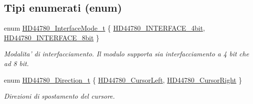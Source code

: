 \subsection*{Tipi enumerati (enum)}
\begin{DoxyCompactItemize}
\item 
enum \hyperlink{group___h_d44780_gaaaea8b73e24f7658da4118f6b01b45f0}{H\+D44780\+\_\+\+Interface\+Mode\+\_\+t} \{ \hyperlink{group___h_d44780_ggaaaea8b73e24f7658da4118f6b01b45f0a45bf6ce7ec7c951f692bdce9f0f485c6}{H\+D44780\+\_\+\+I\+N\+T\+E\+R\+F\+A\+C\+E\+\_\+4bit}, 
\hyperlink{group___h_d44780_ggaaaea8b73e24f7658da4118f6b01b45f0a24da9b234f9358c14184fe21f3c47de5}{H\+D44780\+\_\+\+I\+N\+T\+E\+R\+F\+A\+C\+E\+\_\+8bit}
 \}
\begin{DoxyCompactList}\small\item\em Modalita' di interfacciamento. Il modulo supporta sia interfacciamento a 4 bit che ad 8 bit. \end{DoxyCompactList}\item 
enum \hyperlink{group___h_d44780_gaf46f4db4f981d3a1088804a6d6980d30}{H\+D44780\+\_\+\+Direction\+\_\+t} \{ \hyperlink{group___h_d44780_ggaf46f4db4f981d3a1088804a6d6980d30aa4d704398d4edd1e0dec8dbb55f90292}{H\+D44780\+\_\+\+Cursor\+Left}, 
\hyperlink{group___h_d44780_ggaf46f4db4f981d3a1088804a6d6980d30a26006ced693b6bab28c6e30bfdb8c399}{H\+D44780\+\_\+\+Cursor\+Right}
 \}
\begin{DoxyCompactList}\small\item\em Direzioni di spostamento del cursore. \end{DoxyCompactList}\end{DoxyCompactItemize}
